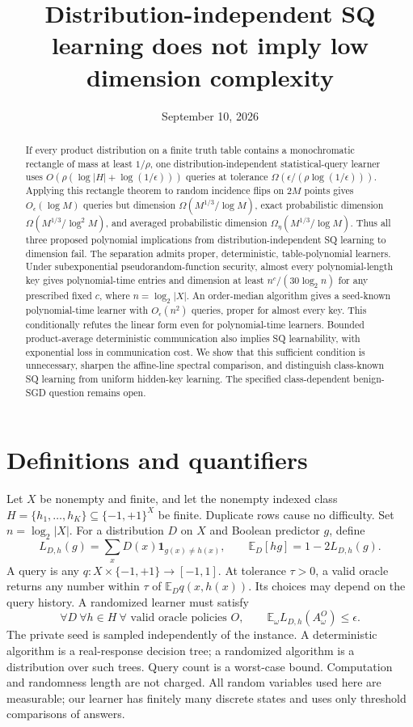 \documentclass[11pt]{article}
\title{Distribution-independent SQ learning does not imply low dimension complexity}
\author{}
\date{September 10, 2026}
\newcommand{\E}{\mathbb E}
\newcommand{\1}{\mathbf 1}
\begin{document}
\maketitle
\begin{abstract}
If every product distribution on a finite truth table contains a monochromatic rectangle of mass at least $1/\rho$, one distribution-independent statistical-query learner uses $O(\rho(\log|H|+\log(1/\epsilon)))$ queries at tolerance $\Omega(\epsilon/(\rho\log(1/\epsilon)))$. Applying this rectangle theorem to random incidence flips on $2M$ points gives $O_\epsilon(\log M)$ queries but dimension $\Omega(M^{1/3}/\log M)$, exact probabilistic dimension $\Omega(M^{1/3}/\log^2M)$, and averaged probabilistic dimension $\Omega_\eta(M^{1/3}/\log M)$. Thus all three proposed polynomial implications from distribution-independent SQ learning to dimension fail. The separation admits proper, deterministic, table-polynomial learners. Under subexponential pseudorandom-function security, almost every polynomial-length key gives polynomial-time entries and dimension at least $n^c/(30\log_2n)$ for any prescribed fixed $c$, where $n=\log_2|X|$. An order-median algorithm gives a seed-known polynomial-time learner with $O_\epsilon(n^2)$ queries, proper for almost every key. This conditionally refutes the linear form even for polynomial-time learners. Bounded product-average deterministic communication also implies SQ learnability, with exponential loss in communication cost. We show that this sufficient condition is unnecessary, sharpen the affine-line spectral comparison, and distinguish class-known SQ learning from uniform hidden-key learning. The specified class-dependent benign-SGD question remains open.
\end{abstract}

\section{Definitions and quantifiers}
Let $X$ be nonempty and finite, and let the nonempty indexed class $H=\{h_1,\ldots,h_K\}\subseteq\{-1,+1\}^X$ be finite. Duplicate rows cause no difficulty. Set $n=\log_2|X|$. For a distribution $D$ on $X$ and Boolean predictor $g$, define
\[
 L_{D,h}(g)=\sum_xD(x)\1_{g(x)\ne h(x)},\qquad
 \E_D[hg]=1-2L_{D,h}(g).
\]
A query is any $q:X\times\{-1,+1\}\to[-1,1]$. At tolerance $\tau>0$, a valid oracle returns any number within $\tau$ of $\E_D q(x,h(x))$. Its choices may depend on the query history. A randomized learner must satisfy
\begin{equation}\label{eq:guarantee}
 \forall D\ \forall h\in H\ \forall\text{ valid oracle policies }O,
 \qquad \E_\omega L_{D,h}(A^O_\omega)\le\epsilon.
\end{equation}
The private seed is sampled independently of the instance. A deterministic algorithm is a real-response decision tree; a randomized algorithm is a distribution over such trees. Query count is a worst-case bound. Computation and randomness length are not charged. All random variables used here are measurable; our learner has finitely many discrete states and uses only threshold comparisons of answers.
\end{document}

